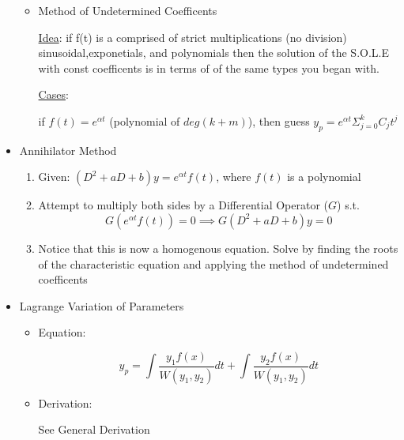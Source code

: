 \documentclass[11pt]{article}
\begin{document}
\begin{itemize}
\begin{itemize}
\item Method of Undetermined Coefficents\\
\label{sec-9.2.5.4.4}

      \underline{Idea}: if f(t) is a comprised of strict multiplications (no division) sinusoidal,exponetials, and
      polynomials then the solution of the S.O.L.E with const
      coefficents is in terms of of the same types you began with.

      \underline{Cases}:
      
      if $f(t)=e^{\alpha t}$ (polynomial of $deg(k+m)$), then guess
      $y_p=e^{\alpha t}\Sigma_{j=0}^k C_jt^j$
\end{itemize} %

\item Annihilator Method\\
\label{sec-9.2.5.5}

\begin{enumerate}
\item Given: $(D^2+aD+b)y=e^{\alpha t}f(t)$, where $f(t)$ is a polynomial
\item Attempt to multiply both sides by a Differential Operator ($G$) s.t.
        \begin{equation}
        G(e^{\alpha t}f(t)) = 0 \implies G(D^2+aD+b)y=0
        \end{equation}
\item Notice that this is now a homogenous equation. Solve by
        finding the roots of the characteristic equation and applying
        the method of undetermined coefficents
\end{enumerate}

\item Lagrange Variation of Parameters\\
\label{sec-9.2.5.6}

\begin{itemize}

\item Equation:\\
\label{sec-9.2.5.6.1}

      \begin{equation}
      y_p=\int{\frac{y_1f(x)}{W(y_1,y_2)}dt}+\int{\frac{y_2f(x)}{W(y_1,y_2)}dt}
      \end{equation}

\item Derivation:\\
\label{sec-9.2.5.6.2}

      See General Derivation
\end{itemize} %
\end{itemize} %
\end{document}
